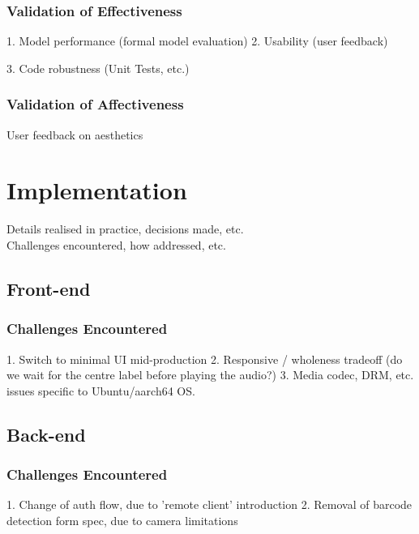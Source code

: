           \subsubsection{Validation of Effectiveness}
              1. Model performance (formal model evaluation)
              2. Usability (user feedback)
    
              3. Code robustness (Unit Tests, etc.)
    
          \subsubsection{Validation of Affectiveness}
              User feedback on aesthetics
    
    
    \section{Implementation}
      Details realised in practice, decisions made, etc.\\
      Challenges encountered, how addressed, etc.
      \subsection{Front-end}
          \subsubsection{Challenges Encountered}
              1. Switch to minimal UI mid-production
              2. Responsive / wholeness tradeoff (do we wait for the centre label before playing the audio?)
              3. Media codec, DRM, etc. issues specific to Ubuntu/aarch64 OS.
    
      \subsection{Back-end} %
          \subsubsection{Challenges Encountered}
              1. Change of auth flow, due to 'remote client' introduction
              2. Removal of barcode detection form spec, due to camera limitations
    
